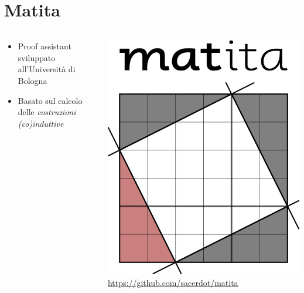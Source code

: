 \documentclass{beamer}
\begin{document}
\section{Matita}
\begin{frame}
\begin{columns}
  \begin{column}{.5\textwidth}
    \begin{itemize}
      \item Proof assistant sviluppato all'Università di Bologna
      \vspace{1.5em}
      \item Basato sul calcolo delle \textit{costruzioni (co)induttive}
    \end{itemize}
  \end{column}
  \begin{column}{.5\textwidth}
    \includegraphics[scale=0.30]{matita.png}
  \href{https://github.com/sacerdot/matita}{https://github.com/sacerdot/matita}
  \end{column}
\end{columns}
\end{frame}
\end{document}
